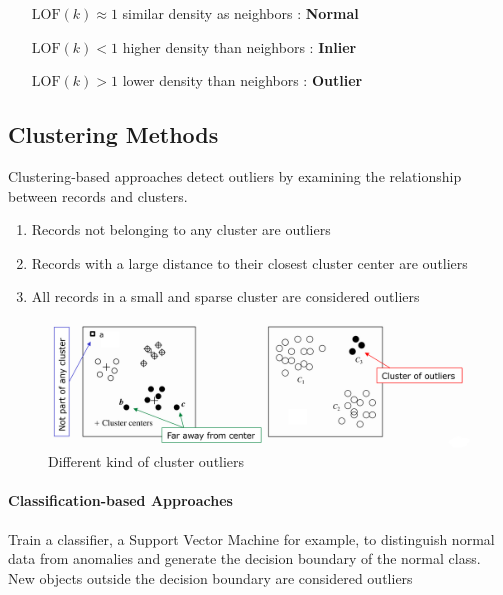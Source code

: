 \documentclass[11pt]{article}
\begin{document}
\begin{itemize}[leftmargin=*, labelindent=2cm, labelsep=1cm]
    \item[$\text{LOF}(k) \approx 1$] similar density as neighbors : \textbf{Normal}
    \item[$\text{LOF}(k) < 1$] higher density than neighbors : \textbf{Inlier}
    \item[$\text{LOF}(k) > 1$]  lower density than neighbors : \textbf{Outlier}
\end{itemize}

\subsection{Clustering Methods}

Clustering-based approaches detect outliers by examining the relationship between records and clusters.

\begin{enumerate}
    \item Records not belonging to any cluster are outliers
    \item Records with a large distance to their closest cluster center are outliers
    \item All records in a small and sparse cluster are considered outliers
\end{enumerate}

\begin{figure}[tbh!]
    \centering
    \includegraphics[width=0.7\linewidth, keepaspectratio]{Pictures/outlier_clustering_method}
    \caption{Different kind of cluster outliers}
    \label{fig:outlierclusteringmethod}
\end{figure}

\paragraph{Classification-based Approaches}

Train a classifier, a Support Vector Machine for example, to distinguish normal data from anomalies and generate the decision boundary of the normal class. New objects outside the decision boundary are considered outliers
\end{document}
